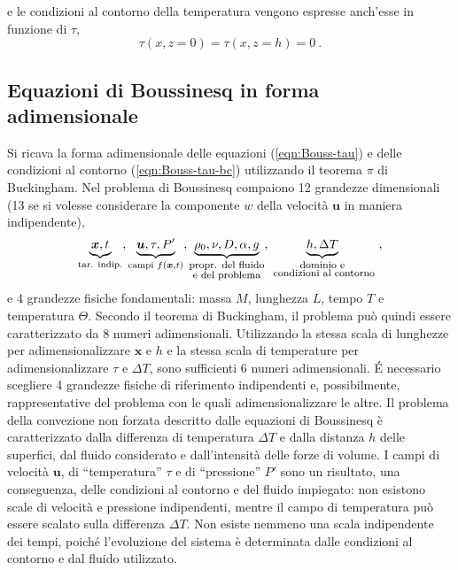 e le condizioni al contorno della temperatura vengono espresse anch'esse in funzione di $\tau$,
\begin{equation}\label{eqn:Bouss-tau-bc}
    \tau(x,z=0) = \tau(x,z=h) = 0 \ .
\end{equation}

\subsection{Equazioni di Boussinesq in forma adimensionale}
Si ricava la forma adimensionale delle equazioni (\ref{eqn:Bouss-tau}) e delle condizioni al contorno (\ref{eqn:Bouss-tau-bc}) utilizzando il teorema $\pi$ di Buckingham. 
\newline
Nel problema di Boussinesq compaiono 12 grandezze dimensionali 
(13 se si volesse considerare la componente $w$ della velocità $\bm{u}$ in maniera indipendente),
\begin{equation}
    \underbrace{\bm{x}, t}_{\text{tar. indip.}}, 
    \underbrace{\bm{u}, \tau, P'}_{\text{campi } f(\bm{x},t)},
    \underbrace{\rho_0, \nu, D, \alpha, g}_{\substack{ \text{\footnotesize{propr. del fluido}} \\ \text{\footnotesize{e del problema}} } }, 
    \underbrace{h, \Delta T}_{\substack{ \text{\footnotesize{dominio e}} \\ \text{\footnotesize{ condizioni al contorno}} } } \ ,
\end{equation}
e 4 grandezze fisiche fondamentali: massa $M$, lunghezza $L$, tempo $T$ e temperatura $\Theta$.
Secondo il teorema di Buckingham, il problema può quindi essere caratterizzato da 8 numeri adimensionali. Utilizzando la stessa scala di lunghezze per adimensionalizzare $\bm{x}$ e $h$ e la stessa scala di temperature per adimensionalizzare $\tau$ e $\Delta T$, sono sufficienti 6 numeri adimensionali.
\newline
\'E necessario scegliere 4 grandezze fisiche di riferimento indipendenti e, possibilmente, rappresentative del problema con le quali adimensionalizzare le altre. Il problema della convezione non forzata  descritto dalle equazioni di Boussinesq è caratterizzato dalla differenza di temperatura $\Delta T$  e dalla distanza $h$ delle superfici, dal fluido considerato e dall'intensità delle forze di volume. I campi di velocità $\bm{u}$, di ``temperatura'' $\tau$ e di ``pressione'' $P'$ sono un risultato, una conseguenza, delle condizioni al contorno e del fluido impiegato: non esistono scale di velocità e pressione indipendenti, mentre il campo di temperatura può essere scalato sulla differenza $\Delta T$. Non esiste nemmeno una scala indipendente dei tempi, poiché l'evoluzione del sistema è determinata dalle condizioni al contorno e dal fluido utilizzato.
